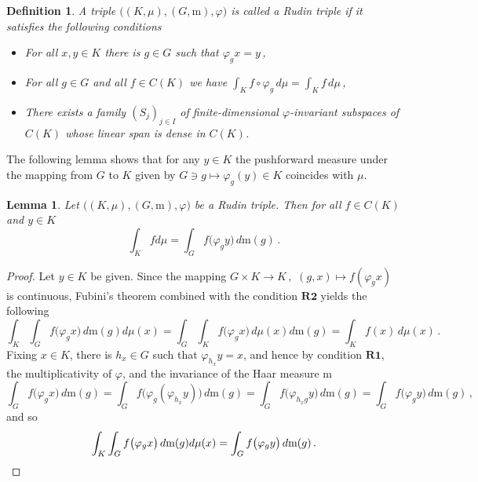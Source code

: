 \documentclass[12pt]{amsart}
\numberwithin{subsection}{section}
\newtheorem{lemma}[theorem]{Lemma}
\newtheorem{definition}[theorem]{Definition}
\theoremstyle{definition}
\theoremstyle{remark}
\begin{document}
\begin{definition}
\label{def:rudin_triple}
A triple  $\big((K,\mu),(G,\mathrm{m}),\varphi\big) $ is called a Rudin triple if it satisfies the following conditions\:
\begin{itemize}
\item[ $\mathbf{R1} $]
        For all $x, y \in K$  there is $g \in G$  such that $\varphi_g x = y$\,,
    \item[ $\mathbf{R2} $]
        For all $g \in G$ and all $f \in C(K)$ we  have
        $\int_K f \circ \varphi_g \, d\mu = \int_K f \, d\mu $\,,
    \item[ $\mathbf{R3} $] There exists a family $(S_j)_{j\in I}$ of finite-dimensional $\varphi$-invariant subspaces of $C(K)$ whose linear span is dense in $C(K)$.
\end{itemize}


\end{definition}




 The following lemma shows that for any $y \in K$ the pushforward measure under the mapping from $G$ to $K$ given by $G \ni g \mapsto \varphi_g(y)\in K$ coincides with 
$\mu$.

\begin{lemma} \label{greatrudy}
Let $\big((K,\mu),(G,\mathrm{m}),\varphi\big)$ be a Rudin triple. Then for all $f \in C(K)$ and $y \in K$
  \[
  \int_K f d\mu = \int_G  f\big(\varphi_gy\big)\, d\mathrm{m}(g) \,.
  \]
 \end{lemma}

\begin{proof}
Let $y \in K$ be given. Since the mapping 
$G \times K \longrightarrow K\,, \,\, (g,x) \mapsto f(\varphi_gx)$  is continuous,  Fubini's theorem combined with the condition $\mathbf{R2} $ yields the following
\[
\int_K \int_G f\big(\varphi_gx\big)\,  d\mathrm{m}(g)d\mu(x)=\int_G \int_K f\big(\varphi_gx\big)\, d\mu(x)d\mathrm{m}(g) = \int_K f(x)\,d\mu(x)\,.
\]
Fixing $x\in K$, there is $h_x \in G$ such that $\varphi_{h_x}y = x$, and hence by condition $\mathbf{R1} $, the multiplicativity of $\varphi$,
and the invariance of the Haar measure $\mathrm{m}$
\[
\int_G f\big(\varphi_gx\big)\, d\mathrm{m}(g) = \int_G f\big(\varphi_g(\varphi_{h_x}y)\big)\, d\mathrm{m}(g)
 = \int_G f\big(\varphi_{h_x g}y\big)\, d\mathrm{m}(g) = \int_G f\big(\varphi_gy\big)\, d\mathrm{m}(g)\,,
\]
and so
\[
\int_K \int_G f\big(\varphi_gx\big) \, d\mathrm{m}(g)d\mu(x) = \int_G f\big(\varphi_gy\big) \, d\mathrm{m}(g)\,. \qedhere
\]
\end{proof}
\end{document}
